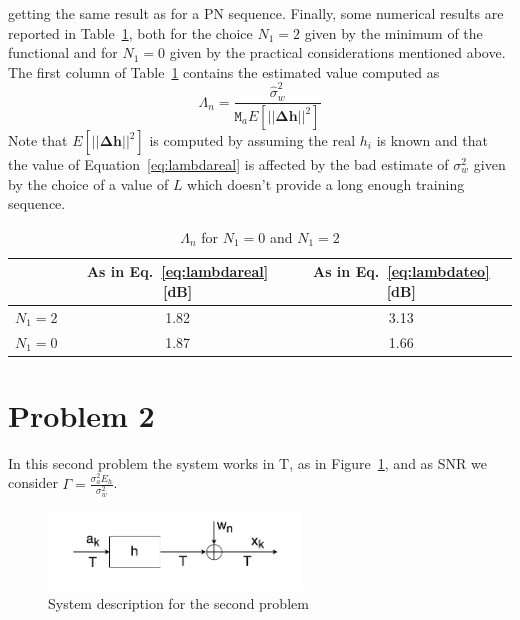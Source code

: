 \documentclass[10pt]{article}
\newcommand{\M} {\mathtt{M}}
\begin{document}
getting the same result as for a PN sequence.
Finally, some numerical results are reported in Table~\ref{table:lambda}, both for the choice $N_1 = 2$ given by the minimum of the functional and for $N_1 = 0$ given by the practical considerations mentioned above. 
The first column of Table~\ref{table:lambda} contains the estimated value computed as
\begin{equation}
	\Lambda_n = \frac{\hat{\sigma}_w^2}{\M_a E[||\mathbf{\Delta h}||^2]}
	\label{eq:lambdareal}
\end{equation}
Note that $E[||\mathbf{\Delta h}||^2]$ is computed by assuming the real $h_i$ is known and that the value of Equation~\eqref{eq:lambdareal} is affected by the bad estimate of $\sigma_w^2$ given by the choice of a value of $L$ which doesn't provide a long enough training sequence.

\begin{table}[h!]
	\centering
	\begin{tabular}{c|c|c}
				&	As in Eq.~\eqref{eq:lambdareal} [dB]	& As in Eq.~\eqref{eq:lambdateo} [dB]  \\ \hline
	$N_1 = 2$	&	1.82							& 3.13 \\
	$N_1 = 0$	&	1.87							& 1.66 \\
	\end{tabular}
	\caption{$\Lambda_n$ for $N_1 = 0$ and $N_1 = 2$}
	\label{table:lambda}
\end{table}

\clearpage


\section*{Problem 2}

In this second problem the system works in T, as in Figure~\ref{fig:channelt}, and as SNR we consider $\Gamma = \frac{\sigma_a^2 E_h}{\sigma_w^2}$. 

\begin{figure}
	\centering
	\includegraphics[width=0.6\textwidth]{channel_t}
	\caption{System description for the second problem}
	\label{fig:channelt}
\end{figure}
\end{document}
